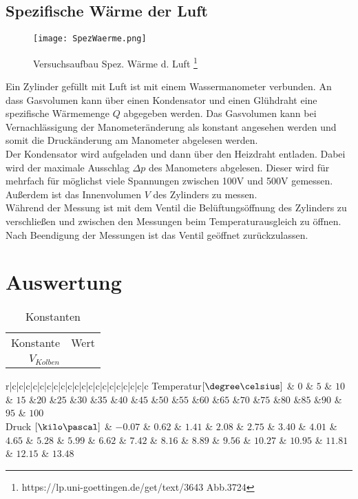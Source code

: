 \documentclass[12pt, a4paper, twoside]{scrartcl}
\begin{document}
\subsection{Spezifische Wärme der Luft}
\begin{figure}
	\centering
	\texttt{[image: SpezWaerme.png]}
	\caption{Versuchsaufbau Spez. Wärme d. Luft \footnote{https://lp.uni-goettingen.de/get/text/3643 Abb.3724}}
\end{figure}
Ein Zylinder gefüllt mit Luft ist mit einem Wassermanometer verbunden. An dass Gasvolumen kann über einen Kondensator und einen Glühdraht eine spezifische Wärmemenge $Q$ abgegeben werden. Das Gasvolumen kann bei Vernachlässigung der Manometeränderung als konstant angesehen werden und somit die Druckänderung am Manometer abgelesen werden. \\
Der Kondensator wird aufgeladen und dann über den Heizdraht entladen. Dabei wird der maximale Ausschlag $\Delta p$ des Manometers abgelesen. Dieser wird für mehrfach für möglichst viele Spannungen zwischen 100V und 500V gemessen. Außerdem ist das Innenvolumen $V$ des Zylinders zu messen. \\
Während der Messung ist mit dem Ventil die Belüftungsöffnung des Zylinders zu verschließen und zwischen den Messungen beim Temperaturausgleich zu öffnen. Nach Beendigung der Messungen ist das Ventil geöffnet zurückzulassen.

\section{Auswertung}
\label{sec:auswertung}


\begin{table}
\centering
\begin{tabular}{r|c}
    Konstante & Wert\\
    $V_{Kolben}$ &  \\
    
 \end{tabular} 
 \caption{\label{tab:}Konstanten}
\end{table}


\begin{table}
\centering
\begin{tabular}{r|c|c|c|c|c|c|c|c|c|c|c|c|c|c|c|c|c|c|c|c}
    Temperatur$[\degree\celsius]$ & $0$ & $5$ & $10$ & $15$ &$20$ &$25$ &$30$ &$35$ &$40$ &$45$ &$50$ &$55$ &$60$ &$65$ &$70$ &$75$ &$80$ &$85$ &$90$ & $95$ & $100$\\
    Druck $[\kilo\pascal]$ &  $-0.07$ & $0.62$ & $ 1.41$ & $2.08$ & $2.75$ & $3.40$ & $4.01$ & $4.65$ & $5.28$ & $5.99$ & $6.62$ & $7.42$ & $8.16$ & $8.89$ & $9.56$ & $10.27$ & $10.95$ & $11.81$ & $12.15$ & $13.48$  \\
    
 \end{tabular} 
 \caption{\label{tab:}Erwärmen}
\end{table}
\end{document}
